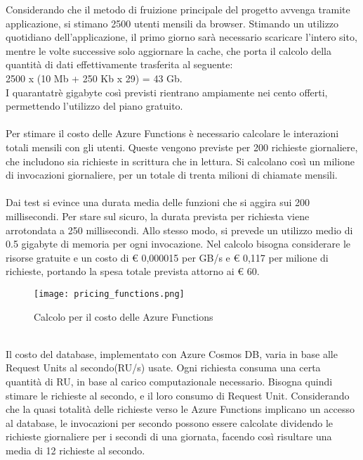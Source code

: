 Considerando che il metodo di fruizione principale del progetto avvenga tramite applicazione,
si stimano 2500 utenti mensili da browser.
Stimando un utilizzo quotidiano dell'applicazione, 
il primo giorno sarà necessario scaricare l'intero sito, 
mentre le volte successive solo aggiornare la cache, 
che porta il calcolo della quantità di dati effettivamente trasferita al seguente:\\
2500 x (10 Mb + 250 Kb x 29) = 43 Gb.\\
I quarantatrè gigabyte così previsti rientrano ampiamente nei cento offerti,
permettendo l'utilizzo del piano gratuito.\\
\\
Per stimare il costo delle Azure Functions è necessario calcolare
le interazioni totali mensili con gli utenti.
Queste vengono previste per 200 richieste giornaliere,
che includono sia richieste in scrittura che in lettura.
Si calcolano così un milione di invocazioni giornaliere, 
per un totale di trenta milioni di chiamate mensili.\\
\\
Dai test si evince una durata media delle funzioni che si aggira sui 200 millisecondi.
Per stare sul sicuro, la durata prevista per richiesta 
viene arrotondata a 250 millisecondi.
Allo stesso modo, si prevede un utilizzo medio di 0.5 gigabyte di memoria per ogni invocazione.
Nel calcolo bisogna considerare le risorse gratuite e
un costo di € 0,000015 per GB/s e € 0,117 per milione di richieste,
portando la spesa totale prevista attorno ai € 60.\\
\begin{figure}[htbp]
    \begin{center}
        \texttt{[image: pricing\_functions.png]}
        \caption{Calcolo per il costo delle Azure Functions}
    \end{center}
\end{figure}
\\
Il costo del database, implementato con Azure Cosmos DB, 
varia in base alle Request Units al secondo(RU/s) usate.
Ogni richiesta consuma una certa quantità di RU, 
in base al carico computazionale necessario.
Bisogna quindi stimare le richieste al secondo,
e il loro consumo di Request Unit.
Considerando che la quasi totalità delle richieste 
verso le Azure Functions implicano un accesso al database,
le invocazioni per secondo possono essere calcolate 
dividendo le richieste giornaliere per i secondi di una giornata,
facendo così risultare una media di 12 richieste al secondo.\\
